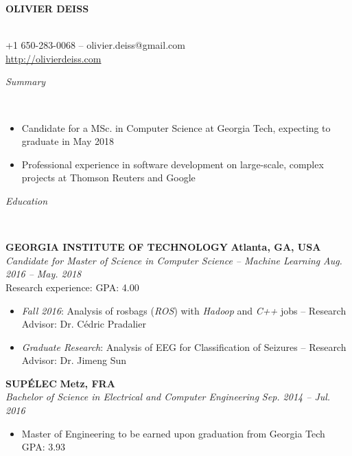 \documentclass[a4paper, 12pt]{article}
\newcommand{\marginline}{-0.3cm}
\newcommand{\margincontent}{-0.6cm}
\newcommand{\margincontentnotextbefore}{-0.3cm}
\newcommand{\marginbeforesection}{0.35cm}
\newcommand{\linewidthperso}{0.02cm}
\newcommand{\styletitle}[1]{\textbf{#1}}
\newcommand{\styledesc}[1]{\textit{#1}}
\newcommand{\styleloc}[1]{\textbf{#1}}
\newcommand{\styledates}[1]{\textit{#1}}
\newcommand{\stylesection}[1]{
  \vspace{\marginbeforesection}
  \begin{normalsize}\textit{#1}\end{normalsize}
  \vspace{\marginline}\\
  \noindent\makebox[\linewidth]{\rule{\textwidth}{\linewidthperso}}

}
\begin{document}
\begin{footnotesize}

\begin{center}
  \begin{small}\textbf{OLIVIER DEISS}\end{small}\\
  +1 650-283-0068 -- olivier.deiss@gmail.com\\
  \url{http://olivierdeiss.com}
\end{center}

\stylesection{Summary}

\vspace{\margincontentnotextbefore}
\begin{itemize}
  \item Candidate for a MSc. in Computer Science at Georgia Tech, expecting to graduate in May 2018
  \item Professional experience in software development on large-scale, complex projects at Thomson Reuters and Google
\end{itemize}

\stylesection{Education}

\styletitle{GEORGIA INSTITUTE OF TECHNOLOGY} \hfill \styleloc{Atlanta, GA, USA}\\
\styledesc{Candidate for Master of Science in Computer Science -- Machine Learning} \hfill \styledates{Aug. 2016 -- May. 2018}\\
Research experience: \hfill GPA: 4.00
\vspace{-0.15cm}
\begin{itemize}
  \item \textit{Fall 2016}: Analysis of rosbags (\textit{ROS}) with \textit{Hadoop} and \textit{C++} jobs -- Research Advisor: Dr. C\'edric Pradalier 
  \item \textit{Graduate Research}: Analysis of EEG for Classification of Seizures -- Research Advisor: Dr. Jimeng Sun
\end{itemize}

\styletitle{SUP\'ELEC} \hfill \styleloc{Metz, FRA}\\
\styledesc{Bachelor of Science in Electrical and Computer Engineering} \hfill \styledates{Sep. 2014 -- Jul. 2016}\\
\vspace{\margincontent}
\begin{itemize}
  \item Master of Engineering to be earned upon graduation from Georgia Tech \hfill GPA: 3.93
\end{itemize}


\end{footnotesize}
\end{document}
